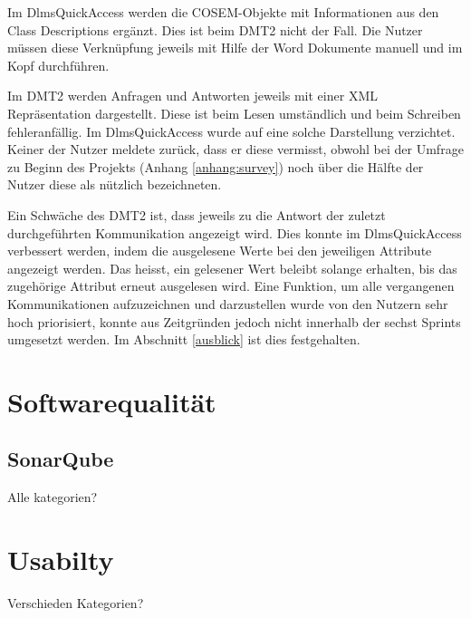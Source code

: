 Im DlmsQuickAccess werden die \ac{COSEM}-Objekte mit Informationen aus den Class Descriptions ergänzt.
Dies ist beim \ac{DMT2} nicht der Fall.
Die Nutzer müssen diese Verknüpfung jeweils mit Hilfe der Word Dokumente manuell und im Kopf durchführen.

Im \ac{DMT2} werden Anfragen und Antworten jeweils mit einer XML Repräsentation dargestellt.
Diese ist beim Lesen umständlich und beim Schreiben fehleranfällig.
Im DlmsQuickAccess wurde auf eine solche Darstellung verzichtet.
Keiner der Nutzer meldete zurück, dass er diese vermisst, obwohl bei der Umfrage zu Beginn des Projekts (Anhang \ref{anhang:survey}) noch über die Hälfte der Nutzer diese als nützlich bezeichneten.

Ein Schwäche des \ac{DMT2} ist, dass jeweils zu die Antwort der zuletzt durchgeführten Kommunikation angezeigt wird.
Dies konnte im DlmsQuickAccess verbessert werden, indem die ausgelesene Werte bei den jeweiligen Attribute angezeigt werden.
Das heisst, ein gelesener Wert beleibt solange erhalten, bis das zugehörige Attribut erneut ausgelesen wird.
Eine Funktion, um alle vergangenen Kommunikationen aufzuzeichnen und darzustellen wurde von den Nutzern sehr hoch priorisiert, konnte aus Zeitgründen jedoch nicht innerhalb der sechst Sprints umgesetzt werden.
Im Abschnitt \ref{ausblick} ist dies festgehalten.



\section{Softwarequalität}\label{evalQuality}

\subsection{SonarQube}
Alle kategorien?


\section{Usabilty}
Verschieden Kategorien?
